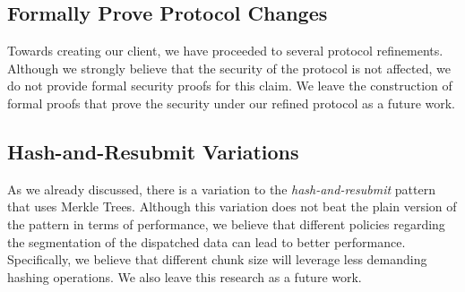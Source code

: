 \subsection{Formally Prove Protocol Changes}

Towards creating our client, we have proceeded to several protocol refinements.
Although we strongly believe that the security of the protocol is not affected,
we do not provide formal security proofs for this claim. We leave the
construction of formal proofs that prove the security under our refined
protocol as a future work.

\subsection{Hash-and-Resubmit Variations}

As we already discussed, there is a variation to the \emph{hash-and-resubmit}
pattern that uses Merkle Trees. Although this variation does not beat the plain
version of the pattern in terms of performance, we believe that different
policies regarding the segmentation of the dispatched data can lead to better
performance. Specifically, we believe that different chunk size will leverage
less demanding hashing operations. We also leave this research as a future
work.
